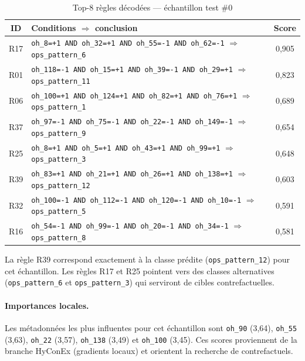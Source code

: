 \documentclass[11pt,a4paper]{article}
\begin{document}
\begin{table}[h]
\centering
\caption{Top-8 règles décodées — échantillon test \#0}
\label{tab:rules}
\small
\begin{tabular}{@{}clc@{}}
\toprule
\textbf{ID} & \textbf{Conditions $\Rightarrow$ conclusion} & \textbf{Score} \\
\midrule
R17 & \texttt{oh\_8=+1 AND oh\_32=+1 AND oh\_55=-1 AND oh\_62=-1} $\Rightarrow$ \texttt{ops\_pattern\_6} & 0,905 \\
R01 & \texttt{oh\_118=-1 AND oh\_15=+1 AND oh\_39=-1 AND oh\_29=+1} $\Rightarrow$ \texttt{ops\_pattern\_11} & 0,823 \\
R06 & \texttt{oh\_100=+1 AND oh\_124=+1 AND oh\_82=+1 AND oh\_76=+1} $\Rightarrow$ \texttt{ops\_pattern\_1} & 0,689 \\
R37 & \texttt{oh\_97=-1 AND oh\_75=-1 AND oh\_22=-1 AND oh\_149=-1} $\Rightarrow$ \texttt{ops\_pattern\_9} & 0,654 \\
R25 & \texttt{oh\_8=+1 AND oh\_5=+1 AND oh\_43=+1 AND oh\_99=+1} $\Rightarrow$ \texttt{ops\_pattern\_3} & 0,648 \\
R39 & \texttt{oh\_83=+1 AND oh\_21=+1 AND oh\_26=+1 AND oh\_138=+1} $\Rightarrow$ \texttt{ops\_pattern\_12} & 0,603 \\
R32 & \texttt{oh\_100=-1 AND oh\_112=-1 AND oh\_120=-1 AND oh\_10=-1} $\Rightarrow$ \texttt{ops\_pattern\_5} & 0,591 \\
R16 & \texttt{oh\_54=-1 AND oh\_99=-1 AND oh\_20=-1 AND oh\_34=-1} $\Rightarrow$ \texttt{ops\_pattern\_8} & 0,581 \\
\bottomrule
\end{tabular}
\end{table}

La règle R39 correspond exactement à la classe prédite (\texttt{ops\_pattern\_12}) pour cet échantillon. Les règles R17 et R25 pointent vers des classes alternatives (\texttt{ops\_pattern\_6} et \texttt{ops\_pattern\_3}) qui serviront de cibles contrefactuelles.

\paragraph{Importances locales.}
Les métadonnées les plus influentes pour cet échantillon sont \texttt{oh\_90} (3,64), \texttt{oh\_55} (3,63), \texttt{oh\_22} (3,57), \texttt{oh\_138} (3,49) et \texttt{oh\_100} (3,45). Ces scores proviennent de la branche HyConEx (gradients locaux) et orientent la recherche de contrefactuels.
\end{document}
